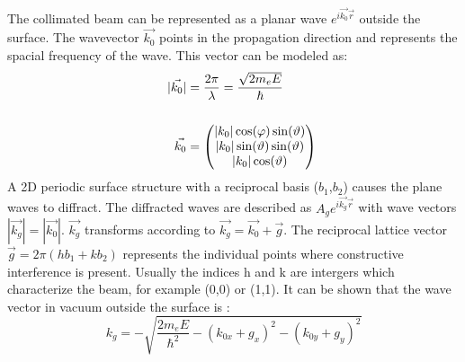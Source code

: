 The collimated beam can be represented as a planar wave $e^{i \vec{k_0} \vec{r}}$  outside the surface.
The wavevector $\vec{k_0}$ points in the propagation direction and represents the spacial frequency of the wave.
This vector can be modeled as:
\begin{align}
    |\vec{k_0}| &= \frac{2 \pi}{\lambda} = \frac{\sqrt{2 m_e E}}{\hbar} \\
    \hspace{1cm} \notag \\
    \vec{k_0} &= \begin{pmatrix}
        |k_0|\cos(\varphi)\sin(\vartheta)\\|k_0|\sin(\vartheta)\sin(\vartheta)\\|k_0| \cos(\vartheta)
    \end{pmatrix}
\end{align}
A 2D periodic surface structure with a reciprocal basis ($b_1$,$b_2$) causes the plane waves to diffract.
The diffracted waves are described as $A_g e^{i \vec{k_g} \vec{r}}$ with wave vectors $|\vec{k_g}| = |\vec{k_0}|$.
$\vec{k_g}$ transforms according to $\vec{k_g} = \vec{k_0} + \vec{g}$.
The reciprocal lattice vector $\vec{g} = 2 \pi ( h b_1 + k b_2)$ represents the individual points where constructive interference is present.
Usually the indices h and k are intergers which characterize the beam, for example (0,0) or (1,1).
It can be shown that the wave vector in vacuum outside the surface is \cite{MoritzWolfgang2022SSDb}:
\begin{equation}
    k_g = - \sqrt{\frac{2 m_e E}{\hbar^2} - (k_{0x}+ g_{x})^2 - (k_{0y}+ g_{y})^2}
\end{equation}


%        
%

